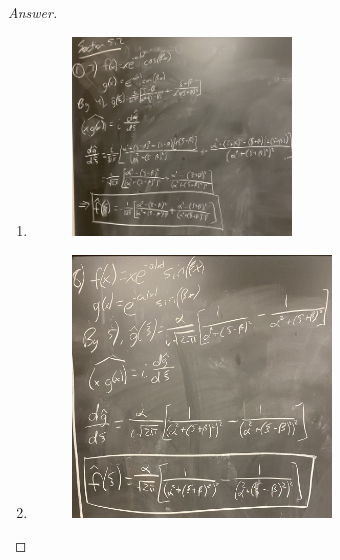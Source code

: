 \documentclass{article}
\theoremstyle{definition}
\renewcommand\qedsymbol{$\blacksquare$}
\newenvironment{ans}{\begin{proof}[Answer]\renewcommand{\qedsymbol}{}}{\end{proof}}
\begin{document}
\begin{ans}
\begin{enumerate}
        \item \phantom{.}
        \begin{figure}[H]
            \centering
            \includegraphics[width = 0.55\textwidth]{Problem 2 Part 7.jpeg}
        \end{figure}

        \item \phantom{.}
        \begin{figure}[H]
            \centering
            \includegraphics[width = 0.65\textwidth]{Problem 2 Part 8.jpeg}
        \end{figure}


\end{enumerate}
\end{ans}
\end{document}
